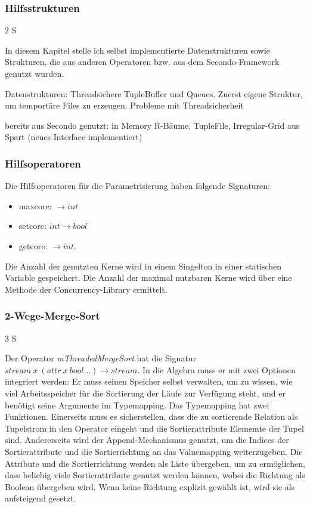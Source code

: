 \documentclass[a4paper,12pt,twoside]{article}
\newcommand{\Fb}[1]{\textit{#1}} %
\begin{document}
\subsubsection{Hilfsstrukturen} 2 S
\label{Hilfsstrukturen} 

In diesem Kapitel stelle ich  selbst implementierte Datenstrukturen sowie Strukturen, die aus anderen Operatoren bzw. aus dem Secondo-Framework genutzt wurden.


Datenstrukturen:
Threadsichere TupleBuffer und Queues. Zuerst eigene Struktur, um temportäre Files zu erzeugen. Probleme mit Threadsicherheit

bereits aus Secondo genutzt: 
in Memory R-Bäume, TupleFile, Irregular-Grid aus Spart (neues Interface implementiert)


\subsubsection{Hilfsoperatoren}

Die Hilfsoperatoren für die Parametrisierung haben folgende Signaturen:

\begin{itemize}
	\item maxcore: $\longrightarrow int$
	\item setcore: $int \longrightarrow bool$
	\item getcore: $\longrightarrow int$.
\end{itemize}

Die Anzahl der genutzten Kerne wird in einem Singelton in einer statischen Variable gespeichert. Die Anzahl der maximal nutzbaren Kerne wird über eine Methode der Concurrency-Library ermittelt.

\subsubsection{2-Wege-Merge-Sort} 3 S

Der Operator \Fb{mThreadedMergeSort} hat die Signatur $stream~x~(attr~x~bool \ldots) \longrightarrow stream$. In die Algebra muss er mit zwei Optionen integriert werden: Er muss seinen Speicher selbst verwalten, um zu wissen, wie viel Arbeitsspeicher für die Sortierung der Läufe zur Verfügung steht, und er benötigt seine Argumente im Typemapping. Das Typemapping hat zwei Funktionen. Einerseits muss es sicherstellen, dass die zu sortierende Relation als Tupelstrom in den Operator eingeht und die Sortierattribute Elememte der Tupel sind. Andererseits wird der Append-Mechanismus genutzt, um die Indices der Sortierattribute und die Sortierrichtung an das Valuemapping weiterzugeben. Die Attribute und die Sortierrichtung werden als Liste übergeben, um zu ermöglichen, dass beliebig viele Sortierattribute genutzt werden können, wobei die Richtung als Boolean übergeben wird. Wenn keine Richtung explizit gewählt ist, wird sie als aufsteigend gesetzt.
\end{document}
